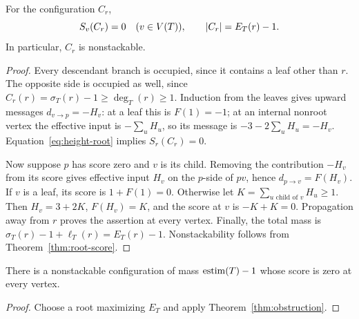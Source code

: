 \begin{theorem}\label{thm:obstruction}
For the configuration $C_r$,
\[
 S_v(C_r)=0\quad(v\in V(T)),\qquad \lvert C_r\rvert=E_T(r)-1.
\]
In particular, $C_r$ is nonstackable.
\end{theorem}
\begin{proof}
Every descendant branch is occupied, since it contains a leaf other than
$r$. The opposite side is occupied as well, since
$C_r(r)=\sigma_T(r)-1\ge\deg_T(r)\ge1$.
Induction from the leaves gives upward messages $d_{v\to p}=-H_v$:
at a leaf this is $F(1)=-1$; at an internal nonroot vertex the effective
input is $-\sum_uH_u$, so its message is
$-3-2\sum_uH_u=-H_v$. Equation~\eqref{eq:height-root} implies
$S_r(C_r)=0$.

Now suppose $p$ has score zero and $v$ is its child. Removing the
contribution $-H_v$ from its score gives effective input $H_v$ on the
$p$-side of $pv$, hence $d_{p\to v}=F(H_v)$.
If $v$ is a leaf, its score is $1+F(1)=0$. Otherwise let
$K=\sum_{u\text{ child of }v}H_u\ge1$.
Then $H_v=3+2K$, $F(H_v)=K$, and the score at $v$ is $-K+K=0$.
Propagation away from $r$ proves the assertion at every vertex.
Finally, the total mass is
$\sigma_T(r)-1+\ell_T(r)=E_T(r)-1$.
Nonstackability follows from Theorem~\ref{thm:root-score}.
\end{proof}

\begin{corollary}\label{cor:extremal-obstruction}
There is a nonstackable configuration of mass $\operatorname{estim}(T)-1$ whose score
is zero at every vertex.
\end{corollary}
\begin{proof}
Choose a root maximizing $E_T$ and apply Theorem~\ref{thm:obstruction}.
\end{proof}
